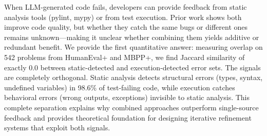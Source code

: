 When LLM-generated code fails, developers can provide feedback from static analysis tools (pylint, mypy) or from test execution. Prior work shows both improve code quality, but whether they catch the same bugs or different ones remains unknown---making it unclear whether combining them yields additive or redundant benefit. We provide the first quantitative answer: measuring overlap on 542 problems from HumanEval+ and MBPP+, we find Jaccard similarity of exactly 0.0 between static-detected and execution-detected error sets. The signals are completely orthogonal. Static analysis detects structural errors (types, syntax, undefined variables) in 98.6\% of test-failing code, while execution catches behavioral errors (wrong outputs, exceptions) invisible to static analysis. This complete separation explains why combined approaches outperform single-source feedback and provides theoretical foundation for designing iterative refinement systems that exploit both signals.
